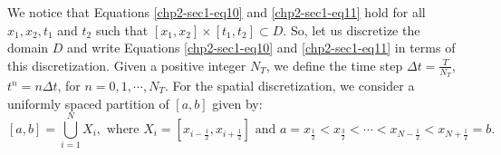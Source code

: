 We notice that Equations \eqref{chp2-sec1-eq10} and \eqref{chp2-sec1-eq11}
hold for all $x_1, x_2, t_1$ and $t_2$ such that
$[x_1, x_2] \times [t_1, t_2] \subset D$.
So, let us discretize the domain $D$ and write 
Equations \eqref{chp2-sec1-eq10} and \eqref{chp2-sec1-eq11} in terms of this discretization.
Given a positive integer $N_T$, we define the time step 
$\Delta t = \frac{T}{N_T}$, $t^{n} = n \Delta t$, for $n = 0, 1 ,\cdots, N_T$.
For the spatial discretization, we consider a uniformly spaced partition of $[a, b]$ given by: 
\begin{equation}
	\label{chp2-sec1-eq13}
	[a,b] = \bigcup_{i=1}^N X_i, 
	\text{ where } X_i= [x_{i-\frac{1}{2}}, x_{i+\frac{1}{2}}] \text{ and } 
	a = x_{\frac{1}{2}} < x_{\frac{3}{2}} < \cdots < x_{N-\frac{1}{2}} < x_{N+\frac{1}{2}} = b.
\end{equation}

